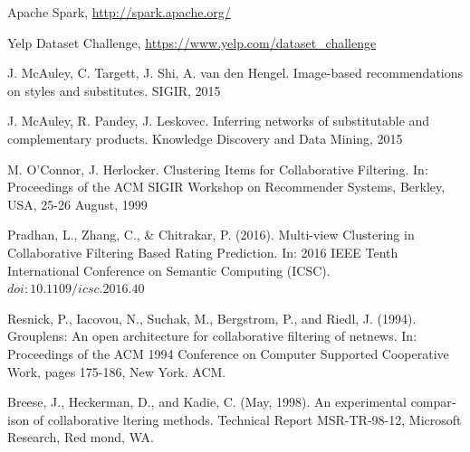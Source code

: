\documentclass[conference]{IEEEtran}
\begin{document}
\begin{thebibliography}{1}

Apache Spark, \url{http://spark.apache.org/}

Yelp Dataset Challenge, \url{https://www.yelp.com/dataset_challenge}

J. McAuley, C. Targett, J. Shi, A. van den Hengel. Image-based recommendations on styles and substitutes. SIGIR, 2015

J. McAuley, R. Pandey, J. Leskovec. Inferring networks of substitutable and complementary products. Knowledge Discovery and Data Mining, 2015

M. O’Connor, J. Herlocker. Clustering Items for Collaborative Filtering. In: Proceedings of the ACM SIGIR Workshop on Recommender Systems, Berkley, USA, 25-26 August, 1999

Pradhan, L., Zhang, C., \& Chitrakar, P. (2016). Multi-view Clustering in Collaborative Filtering Based Rating Prediction. In: 2016 IEEE Tenth International Conference on Semantic Computing (ICSC). $doi:10.1109/icsc.2016.40$

Resnick, P., Iacovou, N., Suchak, M., Bergstrom, P., and Riedl, J. (1994). Grouplens: An open architecture for collaborative filtering of netnews. In: Proceedings of the ACM 1994 Conference on Computer Supported Cooperative Work, pages 175-186, New York. ACM.

Breese, J., Heckerman, D., and Kadie, C. (May, 1998). An experimental compar­ ison of collaborative  ltering methods. Technical Report MSR-TR-98-12, Microsoft Research, Red­ mond, WA.

\end{thebibliography}
\end{document}
